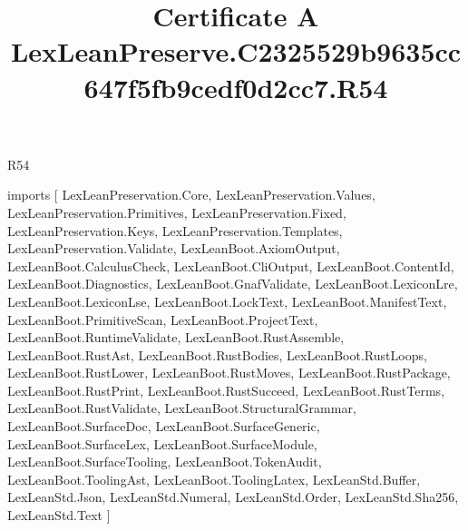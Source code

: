 \begin{lexlean}{R54}
\title{Certificate A LexLeanPreserve.C2325529b9635cc647f5fb9cedf0d2cc7.R54}
\begin{coremodule}
imports [
  LexLeanPreservation.Core,
  LexLeanPreservation.Values,
  LexLeanPreservation.Primitives,
  LexLeanPreservation.Fixed,
  LexLeanPreservation.Keys,
  LexLeanPreservation.Templates,
  LexLeanPreservation.Validate,
  LexLeanBoot.AxiomOutput,
  LexLeanBoot.CalculusCheck,
  LexLeanBoot.CliOutput,
  LexLeanBoot.ContentId,
  LexLeanBoot.Diagnostics,
  LexLeanBoot.GnafValidate,
  LexLeanBoot.LexiconLre,
  LexLeanBoot.LexiconLse,
  LexLeanBoot.LockText,
  LexLeanBoot.ManifestText,
  LexLeanBoot.PrimitiveScan,
  LexLeanBoot.ProjectText,
  LexLeanBoot.RuntimeValidate,
  LexLeanBoot.RustAssemble,
  LexLeanBoot.RustAst,
  LexLeanBoot.RustBodies,
  LexLeanBoot.RustLoops,
  LexLeanBoot.RustLower,
  LexLeanBoot.RustMoves,
  LexLeanBoot.RustPackage,
  LexLeanBoot.RustPrint,
  LexLeanBoot.RustSucceed,
  LexLeanBoot.RustTerms,
  LexLeanBoot.RustValidate,
  LexLeanBoot.StructuralGrammar,
  LexLeanBoot.SurfaceDoc,
  LexLeanBoot.SurfaceGeneric,
  LexLeanBoot.SurfaceLex,
  LexLeanBoot.SurfaceModule,
  LexLeanBoot.SurfaceTooling,
  LexLeanBoot.TokenAudit,
  LexLeanBoot.ToolingAst,
  LexLeanBoot.ToolingLatex,
  LexLeanStd.Buffer,
  LexLeanStd.Json,
  LexLeanStd.Numeral,
  LexLeanStd.Order,
  LexLeanStd.Sha256,
  LexLeanStd.Text
]


\end{coremodule}
\end{lexlean}
